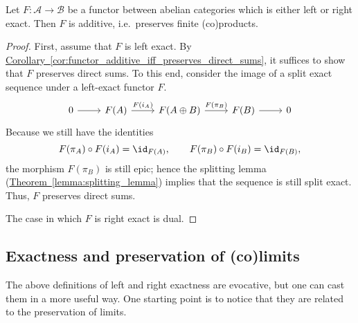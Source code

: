 \documentclass[main.tex]{subfiles}
\begin{document}
\begin{lemma}
  Let $F\colon \mathcal{A} \to \mathcal{B}$ be a functor between abelian categories which is either left or right exact. Then $F$ is additive, i.e.\ preserves finite (co)products.
\end{lemma}
\begin{proof}
  First, assume that $F$ is left exact. By \hyperref[cor:functor_additive_iff_preserves_direct_sums]{Corollary~\ref*{cor:functor_additive_iff_preserves_direct_sums}}, it suffices to show that $F$ preserves direct sums. To this end, consider the image of a split exact sequence under a left-exact functor $F$.
  \begin{equation*}
    \begin{tikzcd}
      0
      \arrow[r]
      & F(A)
      \arrow[r, "F(i_{A})"]
      & F(A \oplus B)
      \arrow[r, "F(\pi_{B})"]
      & F(B)
      \arrow[r]
      & 0
    \end{tikzcd}
  \end{equation*}
  Because we still have the identities
  \begin{equation*}
    F(\pi_{A}) \circ F(i_{A}) = \id_{F(A)},\qquad F(\pi_{B}) \circ F(i_{B}) = \id_{F(B)},
  \end{equation*}
  the morphism $F(\pi_{B})$ is still epic; hence the splitting lemma (\hyperref[lemma:splitting_lemma]{Theorem~\ref*{lemma:splitting_lemma}}) implies that the sequence is still split exact. Thus, $F$ preserves direct sums.

  The case in which $F$ is right exact is dual.
\end{proof}

\subsection{Exactness and preservation of (co)limits}
\label{ssc:exactness_and_preservation_of_co_limits}

The above definitions of left and right exactness are evocative, but one can cast them in a more useful way. One starting point is to notice that they are related to the preservation of limits.
\end{document}
